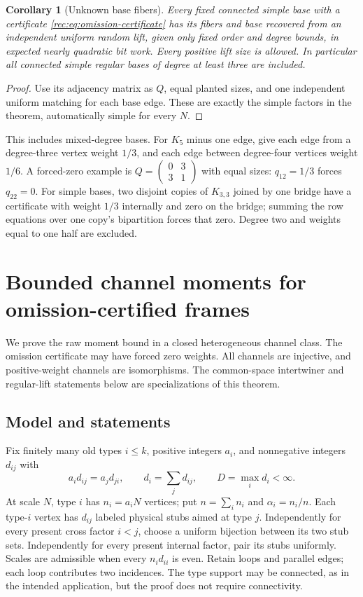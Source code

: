 \documentclass[11pt]{article}
\newtheorem{corollary}[theorem]{Corollary}
\theoremstyle{definition}
\theoremstyle{remark}
\newcommand{\1}{\mathbf 1}
\begin{document}
\begin{corollary}[Unknown base fibers]\label{rec:cor:random-lift}
Every fixed connected simple base with a certificate
\eqref{rec:eq:omission-certificate} has its fibers and base recovered
from an independent uniform random lift, given only fixed order and
degree bounds, in expected nearly quadratic bit work.
Every positive lift size is allowed. In particular all connected
simple regular bases of degree at least three are included.
\end{corollary}
\begin{proof}
Use its adjacency matrix as $Q$, equal planted sizes, and one
independent uniform matching for each base edge. These are exactly
the simple factors in the theorem, automatically simple for every $N$.
\end{proof}

This includes mixed-degree bases. For $K_5$ minus one edge, give each
edge from a degree-three vertex weight $1/3$, and each edge between
degree-four vertices weight $1/6$. A forced-zero example is
$Q=\left(\begin{smallmatrix}0&3\\3&1\end{smallmatrix}\right)$ with
equal sizes: $q_{12}=1/3$ forces $q_{22}=0$.
For simple bases, two disjoint copies of $K_{3,3}$ joined by one
bridge have a certificate with weight $1/3$ internally and zero on
the bridge; summing the row equations over one copy's bipartition
forces that zero. Degree two and weights equal to one half are
excluded.



\clearpage
\section{Bounded channel moments for omission-certified frames}
\label{rec:ch:sec:channel-proof}\label{rec:sec:frame-moment-proof}
We prove the raw moment bound in a closed heterogeneous channel class.
The omission certificate may have forced zero weights. All channels
are injective, and positive-weight channels are isomorphisms.
The common-space intertwiner and regular-lift statements below are
specializations of this theorem.

\subsection{Model and statements}
Fix finitely many old types $i\le k$, positive integers $a_i$, and nonnegative integers $d_{ij}$ with
\[
 a_id_{ij}=a_jd_{ji},\qquad d_i=\sum_jd_{ij},\qquad D=\max_i d_i<\infty.
\]
At scale $N$, type $i$ has $n_i=a_iN$ vertices; put $n=\sum_i n_i$ and $\alpha_i=n_i/n$. Each type-$i$ vertex has $d_{ij}$ labeled physical stubs aimed at type $j$. Independently for every present cross factor $i<j$, choose a uniform bijection between its two stub sets. Independently for every present internal factor, pair its stubs uniformly. Scales are admissible when every $n_id_{ii}$ is even. Retain loops and parallel edges; each loop contributes two incidences. The type support may be connected, as in the intended application, but the proof does not require connectivity.
\end{document}

